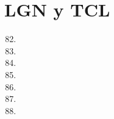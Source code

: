 \section{LGN y TCL}
\begin{enumerate}
	\setcounter{enumi}{81}
	\item
	\item
	\item
	\item
	\item
	\item
	\item
\end{enumerate}
